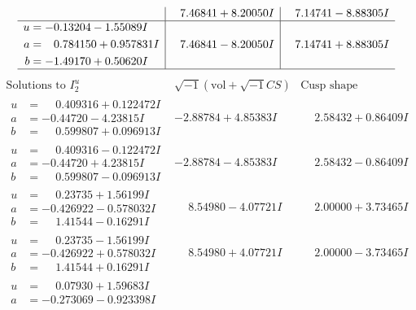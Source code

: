 \documentclass[1p]{elsarticle_modified}
\theoremstyle{definition}
\newcommand{\I}{\sqrt{-1}}
\begin{document}
$$\begin{array}{c|c|c}
 & \phantom{-}7.46841 + 8.20050 I & \phantom{-}7.14741 - 8.88305 I \\ \hline\begin{aligned}
u &= -0.13204 - 1.55089 I \\
a &= \phantom{-}0.784150 + 0.957831 I \\
b &= -1.49170 + 0.50620 I\end{aligned}
 & \phantom{-}7.46841 - 8.20050 I & \phantom{-}7.14741 + 8.88305 I\\
 \hline 
 \end{array}$$\newpage$$\begin{array}{c|c|c}  
\text{Solutions to }I^u_{2}& \I (\text{vol} + \sqrt{-1}CS) & \text{Cusp shape}\\
 \hline 
\begin{aligned}
u &= \phantom{-}0.409316 + 0.122472 I \\
a &= -0.44720 - 4.23815 I \\
b &= \phantom{-}0.599807 + 0.096913 I\end{aligned}
 & -2.88784 + 4.85383 I & \phantom{-}2.58432 + 0.86409 I \\ \hline\begin{aligned}
u &= \phantom{-}0.409316 - 0.122472 I \\
a &= -0.44720 + 4.23815 I \\
b &= \phantom{-}0.599807 - 0.096913 I\end{aligned}
 & -2.88784 - 4.85383 I & \phantom{-}2.58432 - 0.86409 I \\ \hline\begin{aligned}
u &= \phantom{-}0.23735 + 1.56199 I \\
a &= -0.426922 - 0.578032 I \\
b &= \phantom{-}1.41544 - 0.16291 I\end{aligned}
 & \phantom{-}8.54980 - 4.07721 I & \phantom{-}2.00000 + 3.73465 I \\ \hline\begin{aligned}
u &= \phantom{-}0.23735 - 1.56199 I \\
a &= -0.426922 + 0.578032 I \\
b &= \phantom{-}1.41544 + 0.16291 I\end{aligned}
 & \phantom{-}8.54980 + 4.07721 I & \phantom{-}2.00000 - 3.73465 I \\ \hline\begin{aligned}
u &= \phantom{-}0.07930 + 1.59683 I \\
a &= -0.273069 - 0.923398 I \\

\end{aligned}
\end{array}$$
\end{document}
